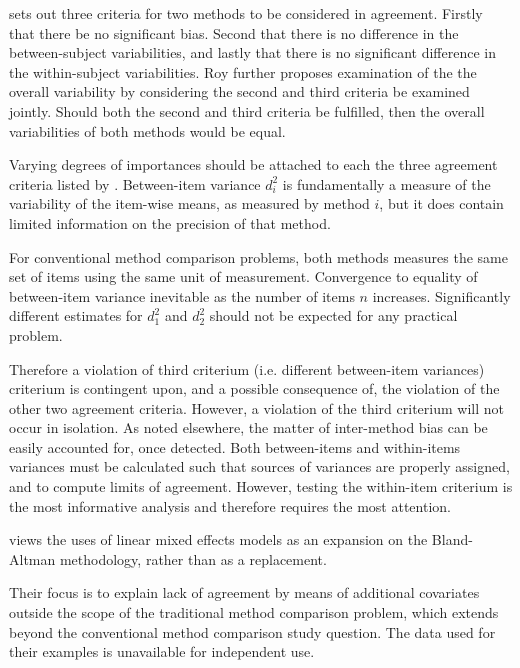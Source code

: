 \documentclass[12pt, a4paper]{report}
\theoremstyle{plain}
\theoremstyle{definition}
\theoremstyle{remark}
\begin{document}
	
	\citet{Barnhart} sets out three criteria for two methods to be considered in agreement. Firstly that there be no significant bias. Second that there is no difference in the between-subject variabilities, and lastly that there is no significant difference in the within-subject variabilities. Roy further proposes examination of the the overall variability by considering the second and third criteria be examined jointly. Should both the second and third criteria be fulfilled, then the overall variabilities of both methods would be equal.
	
	Varying degrees of importances should be attached to each the three agreement criteria listed by \citet{Barnhart}. Between-item variance $d^2_i$ is fundamentally a measure of the variability of the item-wise means, as measured by method $i$, but it does contain limited information on the precision of that method. 
	
	For conventional method comparison problems, both methods measures the same set of items using the same unit of measurement. Convergence to equality of between-item variance inevitable as the number of items $n$ increases. Significantly different estimates for $d^2_1$ and $d^2_2$ should not be expected for any practical problem. 
	
	Therefore a violation of third criterium (i.e. different between-item variances) criterium is contingent upon, and a  
	possible consequence of, the violation of the other two agreement criteria. However, a violation of the third criterium will not occur in isolation. As noted elsewhere, the matter of inter-method bias can be easily accounted for, once detected. Both between-items and within-items variances must be calculated such that sources of variances are properly assigned, and to compute limits of agreement. However, testing the within-item criterium is the most informative analysis and therefore requires the most attention. 

	
	
	
	\citet{LaiShiao} views
	the uses of linear mixed effects models as an expansion on the
	Bland-Altman methodology, rather than as a replacement. 
	
	Their focus is to explain lack of agreement by means of additional covariates outside the scope of the traditional method comparison problem, which extends beyond the conventional method comparison study question. The data used for their examples is unavailable for independent use. 
	
\end{document}
